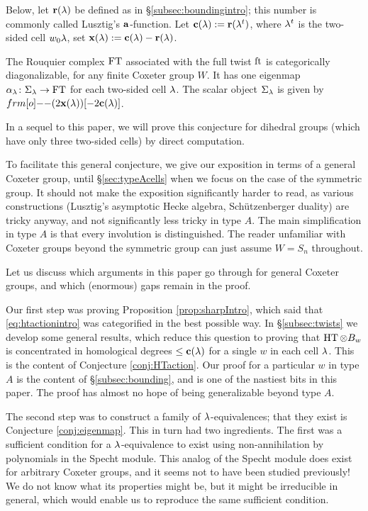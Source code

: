 Below, let $\mathbf{r}(\lambda)$ be defined as in \S\ref{subsec:boundingintro}; this number is commonly called Lusztig's $\mathbf{a}$-function. Let $\mathbf{c}(\lambda) := \mathbf{r}(\lambda^t)$, where $\lambda^t$ is the two-sided cell $w_0 \lambda$, set $\mathbf{x}(\lambda) := \mathbf{c}(\lambda) - \mathbf{r}(\lambda)$. 


\begin{conj} \label{conj:coxIntro} The Rouquier complex $\operatorname{FT}$ associated with the full twist $\operatorname{ft}$ is categorically diagonalizable, for any finite Coxeter group $W$. It has one eigenmap
$\alpha_\lambda \colon \Sigma_\lambda \rightarrow \operatorname{FT}$ for each two-sided cell $\lambda$. The scalar object $\Sigma_\lambda$ is given by $\one(2\xbb(\l))[-2\cbb(\l)]$.\end{conj}

 
In a sequel to this paper, we will prove this conjecture for dihedral groups (which have only three two-sided cells) by direct computation.  

To facilitate this general conjecture, we give our exposition in terms of a general Coxeter group, until \S\ref{sec:typeAcells} when we focus on the case of the symmetric group. It should not make the exposition significantly harder to read, as various constructions (Lusztig's asymptotic Hecke algebra, Sch\"utzenberger duality) are tricky anyway, and not significantly less tricky in type $A$. The main simplification in type $A$ is that every involution is distinguished. The reader unfamiliar with Coxeter groups beyond the symmetric group can just assume $W = S_n$ throughout.

Let us discuss which arguments in this paper go through for general Coxeter groups, and which (enormous) gaps remain in the proof.

Our first step was proving Proposition \ref{prop:sharpIntro}, which said that \eqref{eq:htactionintro} was categorified in the best possible way. In \S\ref{subsec:twists} we develop some general results, which reduce this question to proving that $\operatorname{HT} \otimes B_w$ is concentrated in homological degrees $\le \mathbf{c}(\lambda)$ for a single $w$ in each cell $\lambda$. This is the content of Conjecture \ref{conj:HTaction}. Our proof for a particular $w$ in type $A$ is the content of \S\ref{subsec:bounding}, and is one of the nastiest bits in this paper. The proof has almost no hope of being generalizable beyond type $A$.

The second step was to construct a family of $\lambda$-equivalences; that they exist is Conjecture \ref{conj:eigenmap}. This in turn had two ingredients. The first was a sufficient condition for a $\lambda$-equivalence to exist using non-annihilation by polynomials in the Specht module. This analog of the Specht module does exist for arbitrary Coxeter groups, and it seems not to have been studied previously! We do not know what its properties might be, but it might be irreducible in general, which would enable us to reproduce the same sufficient condition.

